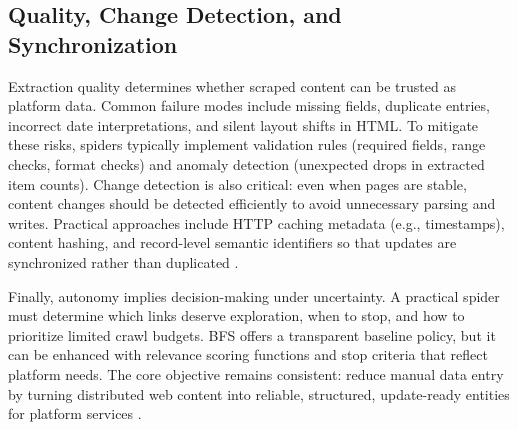 \subsection{Quality, Change Detection, and Synchronization}
Extraction quality determines whether scraped content can be trusted as platform data. Common failure modes include missing fields, duplicate entries, incorrect date interpretations, and silent layout shifts in HTML. To mitigate these risks, spiders typically implement validation rules (required fields, range checks, format checks) and anomaly detection (unexpected drops in extracted item counts). Change detection is also critical: even when pages are stable, content changes should be detected efficiently to avoid unnecessary parsing and writes. Practical approaches include HTTP caching metadata (e.g., timestamps), content hashing, and record-level semantic identifiers so that updates are synchronized rather than duplicated \cite{Narayan2012}.

Finally, autonomy implies decision-making under uncertainty. A practical spider must determine which links deserve exploration, when to stop, and how to prioritize limited crawl budgets. BFS offers a transparent baseline policy, but it can be enhanced with relevance scoring functions and stop criteria that reflect platform needs. The core objective remains consistent: reduce manual data entry by turning distributed web content into reliable, structured, update-ready entities for platform services \cite{Sommerville2010}.
